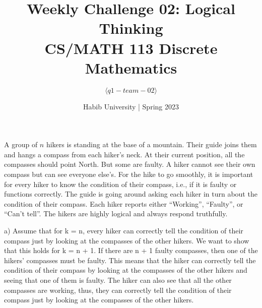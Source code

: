 \documentclass[a4paper]{exam}
\title{Weekly Challenge 02: Logical Thinking\\CS/MATH 113 Discrete Mathematics}
\author{$\langle q1-team-02 \rangle$}  %
\date{Habib University | Spring 2023}
\begin{document}
\maketitle

\begin{questions}
  
  A group of $n$ hikers is standing at the base of a mountain. Their guide joins them and hangs a compass from each hiker's neck. At their current position, all the compasses should point North. But some are faulty. A hiker cannot see their own compass but can see everyone else's. For the hike to go smoothly, it is important for every hiker to know the condition of their compass, i.e., if it is faulty or functions correctly. The guide is going around asking each hiker in turn about the condition of their compass. Each hiker reports either ``Working'', ``Faulty'', or ``Can't tell''. The hikers are highly logical and always respond truthfully.


  \begin{solution}
    a) Assume that for k = n, every hiker can correctly tell the condition of their compass just by looking at the compasses of the other hikers. We want to show that this holds for k = n + 1. If there are n + 1 faulty compasses, then one of the hikers' compasses must be faulty. This means that the hiker can correctly tell the condition of their compass by looking at the compasses of the other hikers and seeing that one of them is faulty. The hiker can also see that all the other compasses are working, thus, they can correctly tell the condition of their compass just by looking at the compasses of the other hikers.


\end{solution}
\end{questions}
\end{document}
